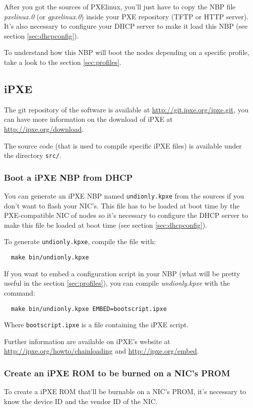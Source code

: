 \documentclass[a4paper,11pt]{article}
\begin{document}
After you got the sources of PXElinux, you'll just have to copy the NBP file \emph{pxelinux.0} (or \emph{gpxelinux.0}) inside your PXE repository (TFTP or HTTP server). It's also necessary to configure your DHCP server to make it load this NBP (see section \ref{sec:dhcpconfig}).

To understand how this NBP will boot the nodes depending on a specific profile, take a look to the section \ref{sec:profiles}.

\subsection{iPXE\label{sec:config:ipxe}}
The git repository of the software is available at \url{http://git.ipxe.org/ipxe.git}, you can have more information on the download of iPXE at \url{http://ipxe.org/download}.

The source code (that is used to compile specific iPXE files) is available under the directory \texttt{src/}.

\subsubsection{Boot a iPXE NBP from DHCP}
You can generate an iPXE NBP named \texttt{undionly.kpxe} from the sources if you don't want to flash your NIC's. This file has to be loaded at boot time by the PXE-compatible NIC of nodes so it's necessary to configure the DHCP server to make this file be loaded at boot time (see section \ref{sec:dhcpconfig}).

To generate \texttt{undionly.kpxe}, compile the file with:
\begin{verbatim}
  make bin/undionly.kpxe
\end{verbatim}

If you want to embed a configuration script in your NBP (what will be pretty useful in the section \ref{sec:profiles}), you can compile \emph{undionly.kpxe} with the command:
\begin{verbatim}
  make bin/undionly.kpxe EMBED=bootscript.ipxe
\end{verbatim}
Where \texttt{bootscript.ipxe} is a file containing the iPXE script.

Further information are available on iPXE's website at \url{http://ipxe.org/howto/chainloading} and \url{http://ipxe.org/embed}.

\subsubsection{Create an iPXE ROM to be burned on a NIC's PROM}
To create a iPXE ROM that'll be burnable on a NIC's PROM, it's necessary to know the device ID and the vendor ID of the NIC.
\end{document}
